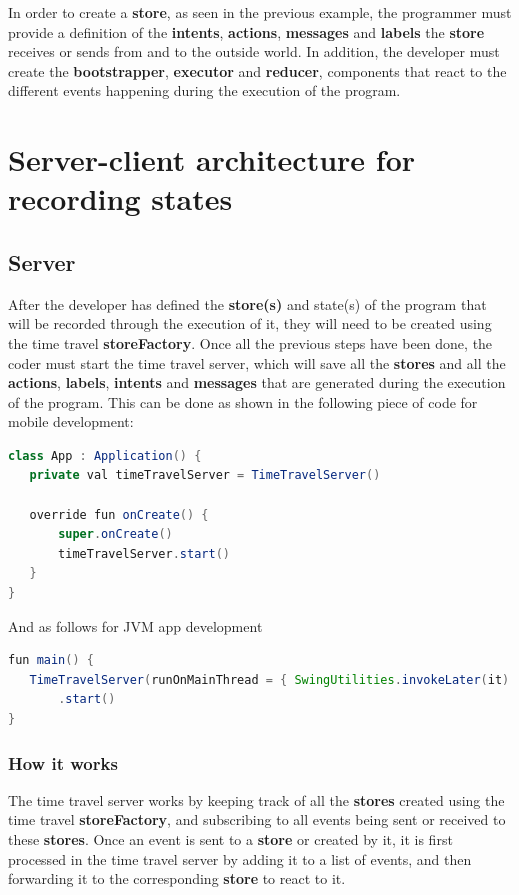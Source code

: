 In order to create a \textbf{store}, as seen in the previous example, the programmer must provide a definition of the \textbf{intents}, \textbf{actions}, \textbf{messages} and \textbf{labels} the \textbf{store} receives or sends from and to the outside world. In addition, the developer must create the \textbf{bootstrapper}, \textbf{executor} and \textbf{reducer}, components that react to the different events happening during the execution of the program.

\section{Server-client architecture for recording states}

\subsection{Server}

After the developer has defined the \textbf{store(s)} and state(s) of the program that will be recorded through the execution of it, they will need to be created using the time travel \textbf{storeFactory}. Once all the previous steps have been done, the coder must start the time travel server, which will save all the \textbf{stores} and all the \textbf{actions}, \textbf{labels}, \textbf{intents} and \textbf{messages} that are generated during the execution of the program. This can be done as shown in the following piece of code for mobile development:

\begin{lstlisting}[language=java]
class App : Application() {
   private val timeTravelServer = TimeTravelServer()

   override fun onCreate() {
       super.onCreate()
       timeTravelServer.start()
   }
}
\end{lstlisting}
And as follows for JVM app development
\begin{lstlisting}[language=java]
fun main() {
   TimeTravelServer(runOnMainThread = { SwingUtilities.invokeLater(it) })
       .start()
}
\end{lstlisting}

\subsubsection{How it works}

The time travel server works by keeping track of all the \textbf{stores} created using the time travel \textbf{storeFactory}, and subscribing to all events being sent or received to these \textbf{stores}. Once an event is sent to a \textbf{store} or created by it, it is first processed in the time travel server by adding it to a list of events, and then forwarding it to the corresponding \textbf{store} to react to it.

